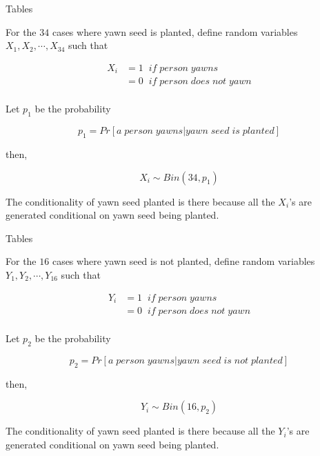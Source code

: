 \documentclass{beamer}\usepackage[]{graphicx}\usepackage[]{color}
\begin{document}
\begin{frame}[fragile]{Tables}

For the $34$ cases where yawn seed is planted, define random variables $X_1, X_2, \cdots, X_{34}$ such that  

\begin{align}
X_i & = 1 \; \; if \; person \; yawns \\
& = 0 \;\; if \; person \; does \; not \; yawn \\
\end{align} 

Let $p_1$ be the probability 

$$ p_1 = Pr [ a \; person \; yawns |  yawn \; seed \; is \; planted ] $$ 

then, 

$$ X_{i} \sim Bin (34, p_{1}) $$

The conditionality of yawn seed planted is there because all the $X_{i}$'s are generated conditional on yawn seed being planted.

\end{frame}


\begin{frame}[fragile]{Tables}

For the $16$ cases where yawn seed is not planted, define random variables $Y_1, Y_2, \cdots, Y_{16}$ such that  

\begin{align}
Y_i & = 1 \; \; if \; person \; yawns \\
& = 0 \;\; if \; person \; does \; not \; yawn \\
\end{align} 

Let $p_2$ be the probability 

$$ p_2 = Pr [ a \; person \; yawns |  yawn \; seed \; is \; not \; planted ] $$ 

then, 

$$ Y_{i} \sim Bin (16, p_{2}) $$

The conditionality of yawn seed planted is there because all the $Y_{i}$'s are generated conditional on yawn seed being planted.

\end{frame}
\end{document}
